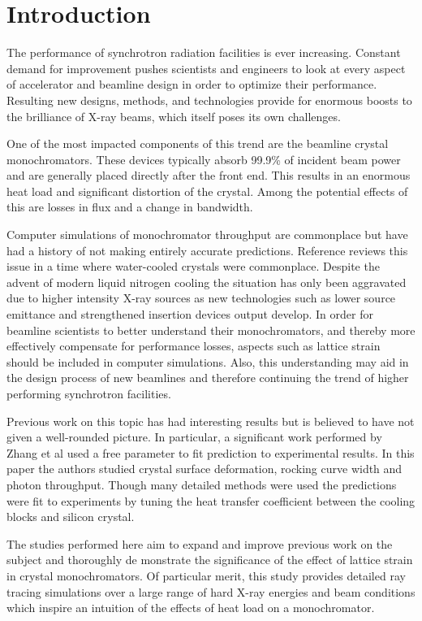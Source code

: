 \documentclass[preprint]{iucr}              %
\begin{document}
\section{Introduction}

The performance of synchrotron radiation facilities is ever increasing. Constant demand for improvement pushes scientists and engineers to look at every aspect of accelerator and beamline design in order to optimize their performance. Resulting new designs, methods, and technologies provide for enormous boosts to the brilliance of X-ray beams, which itself poses its own challenges.

One of the most impacted components of this trend are the beamline crystal monochromators. These devices typically absorb 99.9\% of incident beam power \cite{willmott} and are generally placed directly after the front end. This results in an enormous heat load and significant distortion of the crystal. Among the potential effects of this are losses in flux and a change in bandwidth.

Computer simulations of monochromator throughput are commonplace but have had a history of not making entirely accurate predictions. Reference \cite{innacuratepredictions} reviews this issue in a time where water-cooled crystals were commonplace. Despite the advent of modern liquid nitrogen cooling the situation has only been aggravated due to higher intensity X-ray sources as new technologies such as lower source emittance and strengthened insertion devices output develop. In order for beamline scientists to better understand their monochromators, and thereby more effectively compensate for performance losses, aspects such as lattice strain should be included in computer simulations. Also, this understanding may aid in the design process of new beamlines and therefore continuing the trend of higher performing synchrotron facilities.

Previous work on this topic has had interesting results but is believed to have not given a well-rounded picture. In particular, a significant work performed by Zhang et al \cite{Zhang} used a free parameter to fit prediction to experimental results. In this paper the authors studied crystal surface deformation, rocking curve width and photon throughput. Though many detailed methods were used the predictions were fit to experiments by tuning the heat transfer coefficient between the cooling blocks and silicon crystal.

The studies performed here aim to expand and improve previous work on the subject and thoroughly de
monstrate the significance of the effect of lattice strain in crystal monochromators. Of particular merit, this study provides detailed ray tracing simulations over a large range of hard X-ray energies and beam conditions which inspire an intuition of the effects of heat load on a monochromator.
\end{document}

